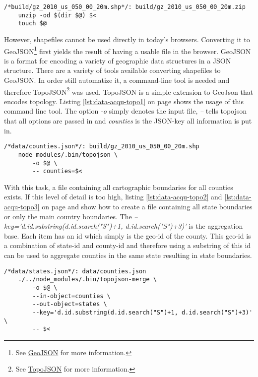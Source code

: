 \begin{lstlisting}[style={makefile}, caption={Make task for unzipping files}, label={lst:data-acqu-unzip}]
/*build/gz_2010_us_050_00_20m.shp*/: build/gz_2010_us_050_00_20m.zip
    unzip -od $(dir $@) $<
    touch $@
\end{lstlisting}

However, shapefiles cannot be used directly in today's browsers. Converting it to GeoJSON\footnote{See \href{http://geojson.org/}{GeoJSON} for more information.} first yields the result of having a usable file in the browser. GeoJSON is a format for encoding a variety of geographic data structures in a JSON structure. There are a variety of tools available converting shapefiles to GeoJSON. In order still automatize it, a command-line tool is needed and therefore TopoJSON\footnote{See \href{https://github.com/mbostock/topojson}{TopoJSON} for more information.} was used. TopoJSON is a simple extension to GeoJson that encodes topology. Listing \ref{lst:data-acqu-topo1} on page \pageref{lst:data-acqu-topo1} shows the usage of this command line tool. The option \textit{-o} simply denotes the input file, \textit{--} tells topojson that all options are passed in and \textit{counties} is the JSON-key all information is put in.

\begin{lstlisting}[style={makefile}, caption={Make task for converting shapefiles to geojson}, label={lst:data-acqu-topo1}]
/*data/counties.json*/: build/gz_2010_us_050_00_20m.shp
    node_modules/.bin/topojson \
        -o $@ \
        -- counties=$<
\end{lstlisting}

With this task, a file containing all cartographic boundaries for all counties exists. If this level of detail is too high, listing \ref{lst:data-acqu-topo2} and \ref{lst:data-acqu-topo3} on page \pageref{lst:data-acqu-topo2} and \pageref{lst:data-acqu-topo3} show how to create a file containing all state boundaries or only the main country boundaries. The \textit{--key='d.id.substring(d.id.search("S")+1, d.id.search("S")+3)'} is the aggregation base. Each item has an id which simply is the geo-id of the county. This geo-id is a combination of state-id and county-id and therefore using a substring of this id can be used to aggregate counties in the same state resulting in state boundaries.

\begin{lstlisting}[style={makefile}, caption={Make task for aggregating counties to states by state-id}, label={lst:data-acqu-topo2}]
/*data/states.json*/: data/counties.json
    ./../node_modules/.bin/topojson-merge \
        -o $@ \
        --in-object=counties \
        --out-object=states \
        --key='d.id.substring(d.id.search("S")+1, d.id.search("S")+3)' \
        -- $<
\end{lstlisting}

